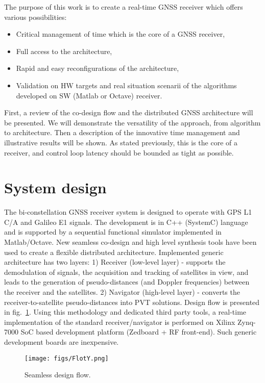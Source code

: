 \documentclass[conference]{IEEEtran}
\begin{document}
The purpose of this work is to create a real-time GNSS receiver which offers various possibilities:
\begin{itemize}
\item Critical management of time which is the core of a GNSS receiver,
\item Full access to the architecture,
\item Rapid and easy reconfigurations of the architecture,
\item Validation on HW targets and real situation scenarii of the algorithms developed on SW (Matlab or Octave) receiver.
\end{itemize}
First, a review of the co-design flow and the distributed GNSS architecture will be presented. We will demonstrate the versatility of the approach, from algorithm to architecture. Then a description of the innovative time management and illustrative results will be shown. As stated previously, this is the core of a receiver, and control loop latency should be bounded as tight as possible.
\section{System design}
The bi-constellation GNSS receiver system is designed to operate with GPS L1 C/A and Galileo E1 signals.
The development is in C++ (SystemC) language and is supported by a sequential functional simulator implemented in Matlab/Octave.
New seamless co-design and high level synthesis tools have been used to create a flexible distributed architecture.
Implemented generic architecture has two layers: 
1) Receiver (low-level layer) - supports the demodulation of signals, the acquisition and tracking of satellites in view, and leads to the generation of pseudo-distances (and Doppler frequencies) between the receiver and the satellites.
2) Navigator (high-level layer) - converts the receiver-to-satellite pseudo-distances into PVT solutions. 
Design flow is presented in fig.~\ref{fig:DesignFlow}.
Using this methodology and dedicated third party tools, a real-time implementation of the standard receiver/navigator is performed on Xilinx Zynq-7000 SoC based development platform (Zedboard + RF front-end). Such generic development boards are inexpensive. 
\begin{figure}[!ht]
\centerline{\texttt{[image: figs/FlotY.png]}}
\caption{Seamless design flow.}
\label{fig:DesignFlow}
\end{figure}
\end{document}
